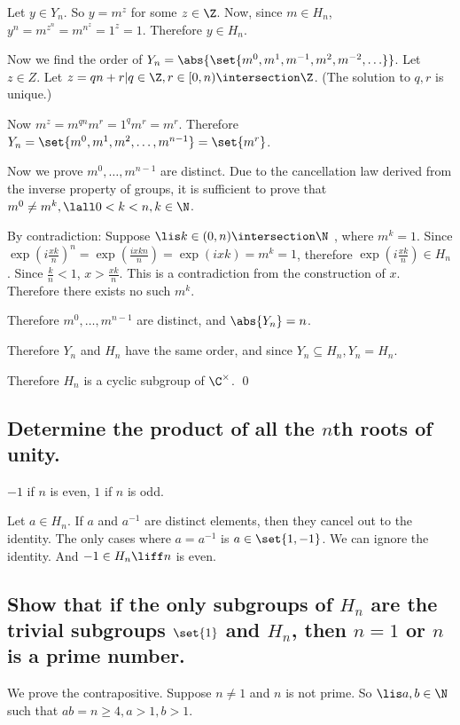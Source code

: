         Let $y \in Y_n$.
        So $y = m^z$ for some $z \in \Z$.
        Now, since $m \in H_n$, $y^n = m^{z^n} = m^{n^z} = 1^z = 1$.
        Therefore $y \in H_n$.

        Now we find the order of $Y_n = \abs{\set{m^{0}, m^1, m^{-1}, m^2, m^{-2}, \hdots}}$.
        Let $z \in Z$.
        Let $z = qn + r | q \in \Z, r \in [0,n) \intersection \Z$. (The solution to $q,r$ is unique.)

        Now $m^z = m^{qn} m^r = 1^q m^r = m^r$.
        Therefore $Y_n = \set{m^0, m^1, m^2, \hdots, m^{n-1}} = \set{m^r}$.

        Now we prove $m^0, \hdots, m^{n-1}$ are distinct.
        Due to the cancellation law derived from the inverse property of groups,
        it is sufficient to prove that $m^0 \neq m^k, \lall 0 < k < n, k \in \N$.

        By contradiction:
        Suppose $\lis k \in (0,n) \intersection \N$
        , where $m^k = 1$.
        Since $\exp(i\frac{xk}{n})^n = \exp(\frac{ixkn}{n}) = \exp(ix k) = m^k = 1$,
        therefore $\exp(i\frac{xk}{n}) \in H_n$.
        Since $\frac{k}{n} < 1$,
        $x > \frac{xk}{n}$.
        This is a contradiction from the construction of $x$.
        Therefore there exists no such $m^k$.

        Therefore $m^0, \hdots, m^{n-1}$ are distinct,
        and $\abs{Y_n} = n$.
        
        Therefore $Y_n$ and $H_n$ have the same order,
        and since $Y_n \subseteq H_n, Y_n = H_n$.

        Therefore $H_n$ is a cyclic subgroup of $\C^\times$.
        \qed


    \subsection[(ii)]{Determine the product of all the $n$th roots of unity.}
        $-1$ if $n$ is even, $1$ if $n$ is odd. 

        Let $a \in H_n$.
        If $a$ and $a^{-1}$ are distinct elements,
        then they cancel out to the identity.
        The only cases where $a = a^{-1}$ is $a \in \set{1, -1}$.
        We can ignore the identity.
        And $-1 \in H_n \liff n $ is even.

    \newpage
    \subsection[(iii)]{Show that if the only subgroups of $H_n$ are the trivial subgroups 
        $\set{1}$ and $H_n$, then $n = 1$ or $n$ is a prime number.}
        We prove the contrapositive.
        Suppose $n \neq 1$ and $n$ is not prime.
        So $\lis a,b \in \N$ such that $ab = n \geq 4, a > 1, b > 1$.

